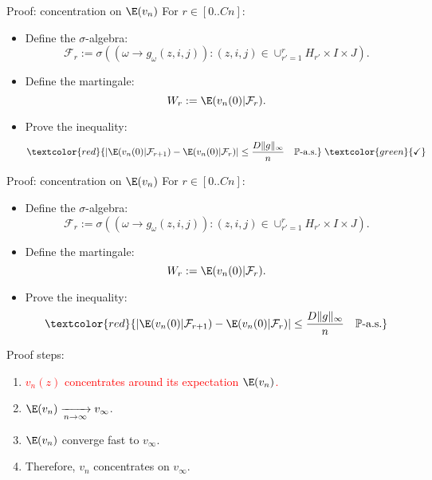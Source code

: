 \begin{frame}{Proof: concentration on $\E(v_n)$}
  For $r \in [0..Cn]$:
  \vspace{0.2cm}

  \begin{itemize}
    \item Define the $\sigma$-algebra:
    \[
      \mathcal{F}_r := \sigma((\omega \to g_{\omega}(z, i, j)): (z, i, j) \in \cup_{r' = 1}^{r}H_{r'}\times I \times J).
    \]
    \item Define the martingale:
      $$
        W_r := \E(v_n(0)|\mathcal{F}_r).
      $$
    \item Prove the inequality:
    \begin{equation*}
      \textcolor{red}{|\E (v_n(0)|\mathcal{F}_{r+1}) - \E (v_n(0)|\mathcal{F}_r)| \leq \frac{D\|g\|_{\infty}}{n} \quad \mathbb{P}\text{-a.s.}} \; \textcolor{green}{\checkmark}
    \end{equation*}
  \end{itemize}
\end{frame}

\begin{frame}{Proof: concentration on $\E(v_n)$ \textcolor{green}{\checkmark}}
  For $r \in [0..Cn]$:
  \vspace{0.2cm}

  \begin{itemize}
    \item Define the $\sigma$-algebra:
    \[
      \mathcal{F}_r := \sigma((\omega \to g_{\omega}(z, i, j)): (z, i, j) \in \cup_{r' = 1}^{r}H_{r'}\times I \times J).
    \]
    \item Define the martingale:
      $$
        W_r := \E(v_n(0)|\mathcal{F}_r).
      $$
    \item Prove the inequality:
    \begin{equation*}
      \textcolor{red}{|\E (v_n(0)|\mathcal{F}_{r+1}) - \E (v_n(0)|\mathcal{F}_r)| \leq \frac{D\|g\|_{\infty}}{n} \quad \mathbb{P}\text{-a.s.}}
    \end{equation*}
  \end{itemize}
\end{frame}

\begin{frame}{Proof steps:}
  \begin{enumerate}
    \item \textcolor{red}{$v_n(z)$ concentrates around its expectation $\E(v_n)$.} \textcolor{green}{\checkmark}
    \item $\E(v_n) \xrightarrow[n \to \infty]{} v_{\infty}$.
    \item $\E(v_n)$ converge fast to $v_{\infty}$.
    \item Therefore, $v_n$ concentrates on $v_{\infty}$.
  \end{enumerate}
\end{frame}